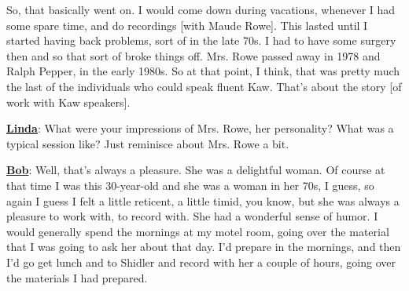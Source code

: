 \documentclass[output=paper]{LSP/langsci}
\begin{document}
So, that basically went on. I would come down during vacations, whenever I had some spare time, and do recordings [with Maude Rowe]. This lasted until I started having back problems, sort of in the late 70s. I had to have some surgery then and so that sort of broke things off. Mrs. Rowe passed away in 1978 and Ralph Pepper, in the early 1980s. So at that point, I think, that was pretty much the last of the individuals who could speak fluent Kaw. That's about the story [of work with Kaw speakers].

\textbf{\underline{Linda}}:  What were your impressions of Mrs. Rowe, her personality? What was a typical session like? Just reminisce about Mrs. Rowe a bit.

\textbf{\underline{Bob}}:  Well, that's always a pleasure. She was a delightful woman. Of course at that time I was this 30-year-old and she was a woman in her 70s, I guess, so again I guess I felt a little reticent, a little timid, you know, but she was always a pleasure to work with, to record with. She had a wonderful sense of humor. I would generally spend the mornings at my motel room, going over the material that I was going to ask her about that day. I'd prepare in the mornings, and then I'd go get lunch and to Shidler and record with her a couple of hours, going over the materials I had prepared. 
\end{document}

